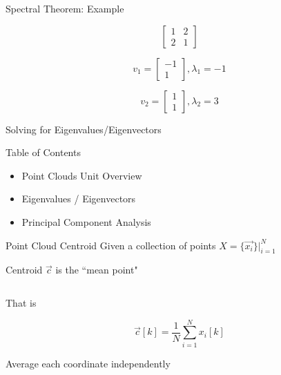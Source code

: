 \documentclass{beamer}
\begin{document}
\begin{frame}{Spectral Theorem: Example}


\[ \left[ \begin{array}{cc} 1 & 2\\ 2 & 1 \end{array} \right]  \]


\[ v_1 = \left[ \begin{array}{c} -1 \\ 1 \end{array} \right], \lambda_1 = -1 \]

\[ v_2 = \left[ \begin{array}{c} 1 \\ 1 \end{array} \right], \lambda_2 = 3 \]

\end{frame}


\begin{frame}{Solving for Eigenvalues/Eigenvectors}

\end{frame}


\begin{frame}{Table of Contents}

\begin{itemize}[label=$\vartriangleright$]
	\item Point Clouds Unit Overview
\end{itemize}
\begin{itemize}[label=$\vartriangleright$]
	\item Eigenvalues / Eigenvectors
\end{itemize}
\begin{itemize}[label=$\blacktriangleright$]
	\item Principal Component Analysis
\end{itemize}

\end{frame}


\begin{frame}{Point Cloud Centroid}
Given a collection of points $X = \{\vec{x_i}\}|_{i=1}^N$

Centroid $\vec{c}$ is the ``mean point"

\[ \]

That is

\[ \vec{c}[k] = \frac{1}{N} \sum_{i=1}^N x_i[k] \]

Average each coordinate independently

\end{frame}
\end{document}
